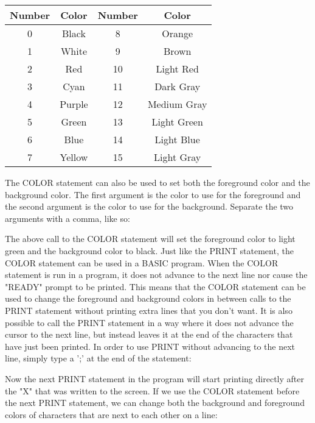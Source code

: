 \begin{tabular}{|c|c|c|c|}
	\hline
	Number & Color & Number & Color\\ \hline
	0 & Black & 8 & Orange \\ \hline
	1 & White & 9 & Brown \\ \hline
	2 & Red & 10 & Light Red \\ \hline
	3 & Cyan & 11 & Dark Gray\\ \hline
	4 & Purple & 12 & Medium Gray\\ \hline
	5 & Green & 13 & Light Green\\ \hline
	6 & Blue & 14 & Light Blue\\ \hline
	7 & Yellow & 15 & Light Gray\\ \hline
\end{tabular}

\vspace{16pt}

The {\ttfamily COLOR} statement can also be used to set both the foreground
color and the background color.  The first argument is the color to use for the
foreground and the second argument is the color to use for the background.
Separate the two arguments with a comma, like so:\\


The above call to the {\ttfamily COLOR} statement will set the foreground color
to light green and the background color to black.  Just like the {\ttfamily
PRINT} statement, the {\ttfamily COLOR} statement can be used in a BASIC
program.  When the {\ttfamily COLOR} statement is run in a program, it does not
advance to the next line nor cause the "READY" prompt to be printed.  This
means that the {\ttfamily COLOR} statement can be used to change the foreground
and background colors in between calls to the {\ttfamily PRINT} statement
without printing extra lines that you don't want.  It is also possible to call
the {\ttfamily PRINT} statement in a way where it does not advance the cursor
to the next line, but instead leaves it at the end of the characters that have
just been printed.  In order to use {\ttfamily PRINT} without advancing to the
next line, simply type a ';' at the end of the statement:\\


Now the next {\ttfamily PRINT} statement in the program will start printing
directly after the "X" that was written to the screen.  If we use the
{\ttfamily COLOR} statement before the next {\ttfamily PRINT} statement, we can
change both the background and foreground colors of characters that are next to
each other on a line:\\

